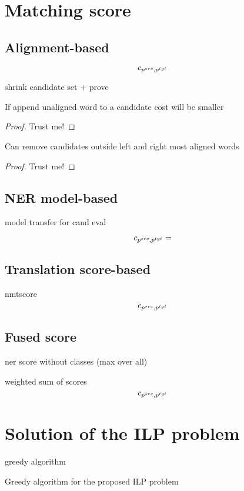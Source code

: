 \section{Matching score}
\subsection{Alignment-based}

\begin{equation} \label{eq:align_cost}
    c_{p^{src}, p^{tgt}}
\end{equation}

shrink candidate set + prove

\begin{lemma}
    If append unaligned word to a candidate cost will be smaller
\end{lemma}
\begin{proof}
    Trust me!
\end{proof}

\begin{theorem}
    Can remove candidates outside left and right most aligned words
\end{theorem}
\begin{proof}
    Trust me!
\end{proof}

\subsection{NER model-based}

model transfer for cand eval

\begin{equation} \label{eq:ner_cost}
    c_{p^{src}, p^{tgt}} =
\end{equation}

\subsection{Translation score-based}

nmtscore
\begin{equation} \label{eq:nmt_cost}
    c_{p^{src}, p^{tgt}}
\end{equation}

\subsection{Fused score}

ner score without classes (max over all)

weighted sum of scores
\begin{equation} \label{eq:fused_cost}
    c_{p^{src}, p^{tgt}}
\end{equation}

\section{Solution of the ILP problem}

greedy algorithm
\begin{algorithm}
    \caption{Greedy algorithm for the proposed ILP problem} \label{alg:ilp_greedy}
\end{algorithm}